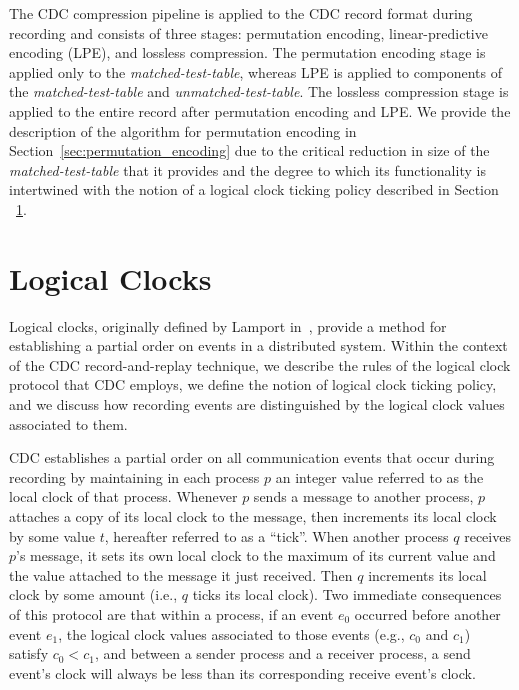 The CDC compression pipeline is applied to the CDC record format
during recording and consists of three stages: permutation encoding,
linear-predictive encoding (LPE), and lossless compression. The
permutation encoding stage is applied only to the
\textit{matched-test-table}, whereas LPE is applied to components of
the \textit{matched-test-table} and \textit{unmatched-test-table}. The
lossless compression stage is applied to the entire record after
permutation encoding and LPE. We provide the description of the
algorithm for permutation encoding in
Section~\ref{sec:permutation_encoding} due to the critical reduction
in size of the \textit{matched-test-table} that it provides and the
degree to which its functionality is intertwined with the notion of a
logical clock ticking policy described in Section
~\ref{sec:logical_clocks}.

\section{Logical Clocks} \label{sec:logical_clocks}

Logical clocks, originally defined by Lamport
in~\cite{LogicalClocks:Lamport:1978}, provide a method for
establishing a partial order on events in a distributed system. Within
the context of the CDC record-and-replay technique, we describe 
the rules of the logical clock protocol that CDC employs, we define
the notion of logical clock ticking policy, and we discuss how
recording events are distinguished by the logical clock values
associated to them.

CDC establishes a partial order on all communication events that occur
during recording by maintaining in each process $p$ an integer value
referred to as the local clock of that process.  Whenever $p$ sends a
message to another process, $p$ attaches a copy of its local clock to
the message, then increments its local clock by some value $t$,
hereafter referred to as a ``tick''.  When another process $q$ receives
$p$'s message, it sets its own local clock to the maximum of its
current value and the value attached to the message it just
received. Then $q$ increments its local clock by some amount (i.e.,
$q$ ticks its local clock). Two immediate consequences of this
protocol are that within a process, if an event $e_0$ occurred before
another event $e_1$, the logical clock values associated to those
events (e.g., $c_0$ and $c_1$) satisfy $c_0 < c_1$, and between a
sender process and a receiver process, a send event's clock will
always be less than its corresponding receive event's clock.

